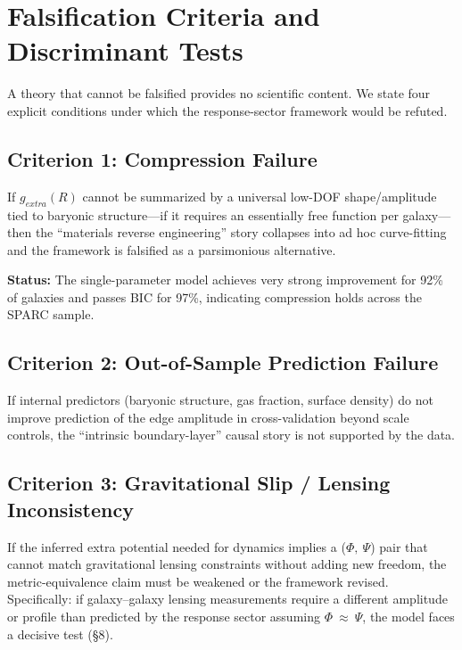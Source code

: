 \documentclass[11pt]{article}
\begin{document}
\section{Falsification Criteria and Discriminant Tests}\label{falsification-criteria-and-discriminant-tests}

A theory that cannot be falsified provides no scientific content. We state four explicit conditions under which the response-sector framework would be refuted.

\subsection{Criterion 1: Compression Failure}\label{criterion-1-compression-failure}

If \(g_{extra}(R)\) cannot be summarized by a universal low-DOF shape/amplitude tied to baryonic structure---if it requires an essentially free function per galaxy---then the ``materials reverse engineering'' story collapses into ad hoc curve-fitting and the framework is falsified as a parsimonious alternative.

\textbf{Status:} The single-parameter model achieves very strong improvement for 92\% of galaxies and passes BIC for 97\%, indicating compression holds across the SPARC sample.

\subsection{Criterion 2: Out-of-Sample Prediction Failure}\label{criterion-2-out-of-sample-prediction-failure}

If internal predictors (baryonic structure, gas fraction, surface density) do not improve prediction of the edge amplitude in cross-validation beyond scale controls, the ``intrinsic boundary-layer'' causal story is not supported by the data.

\subsection{Criterion 3: Gravitational Slip / Lensing Inconsistency}\label{criterion-3-gravitational-slip-lensing-inconsistency}

If the inferred extra potential needed for dynamics implies a (\(\Phi,\ \Psi\)) pair that cannot match gravitational lensing constraints without adding new freedom, the metric-equivalence claim must be weakened or the framework revised. Specifically: if galaxy--galaxy lensing measurements require a different amplitude or profile than predicted by the response sector assuming \(\Phi\  \approx \ \Psi\), the model faces a decisive test (§8).
\end{document}
